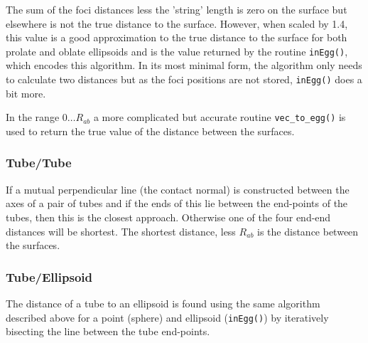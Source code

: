 {{{{{The sum of the foci distances less the 'string' length is zero on the surface but elsewhere is not
the true distance to the surface.  However, when scaled by 1.4, this value is a good approximation
to the true distance to the surface for both prolate and oblate ellipsoids and is the value returned
by the routine {\tt inEgg()}, which encodes this algorithm.   In its most minimal form, the algorithm
only needs to calculate two distances but as the foci positions are not stored, {\tt inEgg()} does
a bit more. 

In the range $0\ldots R_{ab}$ a more complicated but accurate routine {\tt vec\_to\_egg()} is
used to return the true value of the distance between the surfaces.

\subsubsection{Tube/Tube}

If a mutual perpendicular line (the contact normal) is constructed between the axes of a pair
of tubes and if the ends of this lie between the end-points of the tubes, then this is the
closest approach.   Otherwise one of the four end-end distances will be shortest.   The shortest
distance, less $R_{ab}$ is the distance between the surfaces.

\subsubsection{Tube/Ellipsoid}

The distance of a tube to an ellipsoid is found using the same algorithm described above
for a point (sphere) and ellipsoid ({\tt inEgg()}) by iteratively bisecting the line between the
tube end-points.

}}}}}
